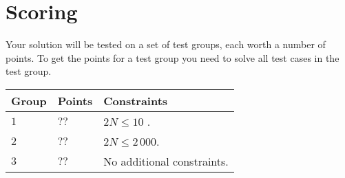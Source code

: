 \section*{Scoring}
Your solution will be tested on a set of test groups, each worth a number of points.
To get the points for a test group you need to solve all test cases in the test group.

\noindent
\begin{tabular}{| l | l | l |}
  \hline
  Group & Points & Constraints \\ \hline
  $1$    & $??$        &  $2N \le 10$ . \\ \hline
  $2$    & $??$        &  $2N \le 2\,000$. \\ \hline
  $3$    & $??$        &  No additional constraints. \\ \hline
\end{tabular}
